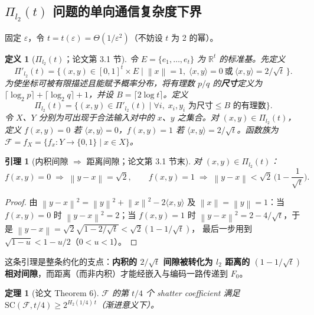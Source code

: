 \documentclass[UTF8, 11pt, a4paper, linestretch=1.15]{ctexart}
\theoremstyle{zhstyle}
\newtheorem{theorem}{定理}
\newtheorem{lemma}{引理}
\newtheorem{definition}{定义}
\newcommand{\eps}{\varepsilon}
\newcommand{\Fzero}{F_0}
\newcommand{\R}{\mathbb{R}}
\newcommand{\inner}[2]{\langle #1, #2 \rangle}
\newcommand{\norm}[1]{\left\lVert #1 \right\rVert}
\begin{document}
	\subsection{$\Pi_{l_2}(t)$ 问题的单向通信复杂度下界}
	
	固定 $\eps$，令 $t = t(\eps) = \Theta(1/\eps^2)$（不妨设 $t$ 为 2 的幂）。
	
	\begin{definition}[$\Pi_{l_2}(t)$；论文第 3.1 节]
		令 $E = \{e_1, \dots, e_t\}$ 为 $\R^t$ 的标准基。先定义
		\[
		\Pi'_{l_2}(t) = \big\{(x, y) \in [0,1]^t \times E \;\big|\; \norm{x} = 1,\;
		\inner{x}{y} = 0 \ \text{或}\ \inner{x}{y} = 2/\sqrt{t}\,\big\}.
		\]
		为使坐标可被有限描述且能赋予概率分布，将有理数 $p/q$ 的\textbf{尺寸}定义为
		$\lceil \log_2 p \rceil + \lceil \log_2 q \rceil + 1$，并设 $B = \lceil 2\log t \rceil$。定义
		\[
		\Pi_{l_2}(t) = \big\{(x, y) \in \Pi'_{l_2}(t) \;\big|\; \forall i,\;
		x_i, y_i \text{ 为尺寸} \leq B \text{ 的有理数}\big\}.
		\]
		令 $X$、$Y$ 分别为可出现于合法输入对中的 $x$、$y$ 之集合。对
		$(x,y) \in \Pi_{l_2}(t)$，定义 $f(x,y) = 0$ 若 $\inner{x}{y} = 0$，$f(x,y) = 1$ 若
		$\inner{x}{y} = 2/\sqrt{t}$。函数族为
		$\mathcal{F} = f_X = \{f_x: Y \to \{0,1\} \mid x \in X\}$。
	\end{definition}
	
	\begin{lemma}[内积间隙 $\Rightarrow$ 距离间隙；论文第 3.1 节末]
		对 $(x,y) \in \Pi_{l_2}(t)$：
		\[
		f(x,y) = 0 \;\Rightarrow\; \norm{y - x} = \sqrt{2},
		\qquad
		f(x,y) = 1 \;\Rightarrow\; \norm{y - x} < \sqrt{2}\,\Big(1 - \frac{1}{\sqrt{t}}\Big).
		\]
	\end{lemma}
	
	\begin{proof}
		由 $\norm{y-x}^2 = \norm{y}^2 + \norm{x}^2 - 2\inner{x}{y}$ 及
		$\norm{x} = \norm{y} = 1$：当 $f(x,y) = 0$ 时 $\norm{y-x}^2 = 2$；当 $f(x,y) = 1$ 时
		$\norm{y-x}^2 = 2 - 4/\sqrt{t}$，于是
		$\norm{y-x} = \sqrt{2}\sqrt{1 - 2/\sqrt{t}} < \sqrt{2}(1 - 1/\sqrt{t})$，
		最后一步用到 $\sqrt{1-u} < 1 - u/2$（$0 < u < 1$）。
	\end{proof}
	
	这条引理是整条约化的支点：\textbf{内积的 $2/\sqrt{t}$ 间隙被转化为 $l_2$ 距离的
		$(1 - 1/\sqrt{t})$ 相对间隙}，而距离（而非内积）才能经嵌入与编码一路传递到 $\Fzero$。
	
	\begin{theorem}[论文 Theorem 6]
		$\mathcal{F}$ 的第 $t/4$ 个 shatter coefficient 满足
		$\mathrm{SC}(\mathcal{F}, t/4) \geq 2^{H_2(1/4)\,t}$（渐进意义下）。
	\end{theorem}
	
\end{document}
